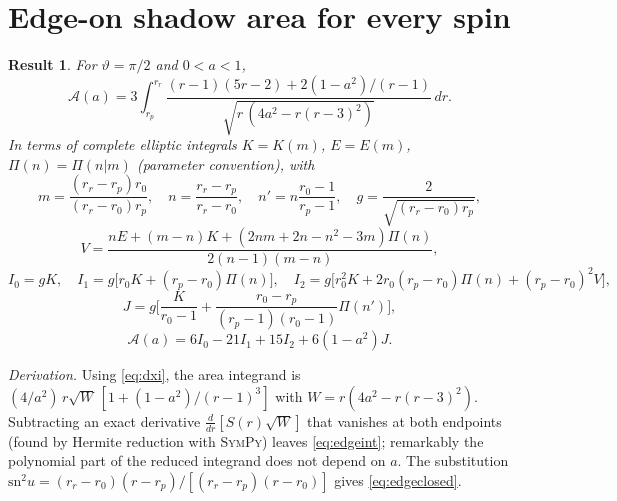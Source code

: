 \documentclass[11pt,a4paper]{article}
\newtheorem{result}{Result}
\theoremstyle{remark}
\numberwithin{equation}{section}
\begin{document}
\section{Edge-on shadow area for every spin}\label{sec:edge}
\begin{result}\label{res:edge}
For $\vartheta=\pi/2$ and $0<a<1$,
\begin{equation}
\mathcal A(a)=3\int_{r_p}^{r_r}\frac{(r-1)(5r-2)+2(1-a^2)/(r-1)}{\sqrt{r\,(4a^2-r(r-3)^2)}}\,dr .
\label{eq:edgeint}
\end{equation}
In terms of complete elliptic integrals $K=K(m)$, $E=E(m)$, $\Pi(n)=\Pi(n|m)$ (parameter convention),
with
\[
m=\frac{(r_r-r_p)r_0}{(r_r-r_0)r_p},\quad n=\frac{r_r-r_p}{r_r-r_0},\quad n'=n\frac{r_0-1}{r_p-1},\quad
g=\frac{2}{\sqrt{(r_r-r_0)r_p}},
\]
\[
V=\frac{nE+(m-n)K+(2nm+2n-n^2-3m)\Pi(n)}{2(n-1)(m-n)},
\]
\[
I_0=gK,\quad I_1=g\big[r_0K+(r_p-r_0)\Pi(n)\big],\quad
I_2=g\big[r_0^2K+2r_0(r_p-r_0)\Pi(n)+(r_p-r_0)^2V\big],
\]
\[
J=g\Big[\frac{K}{r_0-1}+\frac{r_0-r_p}{(r_p-1)(r_0-1)}\Pi(n')\Big],
\]
\begin{equation}
\mathcal A(a)=6I_0-21I_1+15I_2+6(1-a^2)J .
\label{eq:edgeclosed}
\end{equation}
\end{result}
\emph{Derivation.} Using \eqref{eq:dxi}, the area integrand is
$(4/a^2)\,r\sqrt{W}\,[1+(1-a^2)/(r-1)^3]$ with $W=r(4a^2-r(r-3)^2)$. Subtracting an exact derivative
$\frac{d}{dr}[S(r)\sqrt W]$ that vanishes at both endpoints (found by Hermite reduction with \textsc{SymPy})
leaves \eqref{eq:edgeint}; remarkably the polynomial part of the reduced integrand does not depend on $a$.
The substitution $\mathrm{sn}^2u=(r_r-r_0)(r-r_p)/[(r_r-r_p)(r-r_0)]$ gives \eqref{eq:edgeclosed}.
\end{document}
